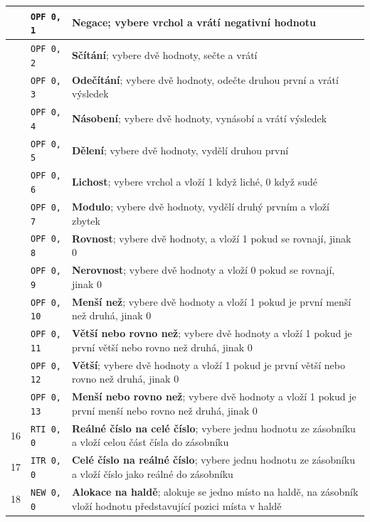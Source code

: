 \documentclass[
12pt,
a4paper,
pdftex,
czech,
titlepage
]{report}
\begin{document}
\begin{longtable}{|c|l|p{10cm}|}
\rule{0pt}{3ex} & \texttt{OPF 0, 1} & \textbf{Negace}; vybere vrchol a vrátí negativní hodnotu \\ \hline
\rule{0pt}{3ex} & \texttt{OPF 0, 2} & \textbf{Sčítání}; vybere dvě hodnoty, sečte a vrátí \\ \hline
\rule{0pt}{3ex} & \texttt{OPF 0, 3} & \textbf{Odečítání}; vybere dvě hodnoty, odečte druhou první a vrátí výsledek \\ \hline
\rule{0pt}{3ex} & \texttt{OPF 0, 4} & \textbf{Násobení}; vybere dvě hodnoty, vynásobí a vrátí výsledek \\ \hline
\rule{0pt}{3ex} & \texttt{OPF 0, 5} & \textbf{Dělení}; vybere dvě hodnoty, vydělí druhou první \\ \hline
\rule{0pt}{3ex} & \texttt{OPF 0, 6} & \textbf{Lichost}; vybere vrchol a vloží 1 když liché, 0 když sudé \\ \hline
\rule{0pt}{3ex} & \texttt{OPF 0, 7} & \textbf{Modulo}; vybere dvě hodnoty, vydělí druhý prvním a vloží zbytek \\ \hline
\rule{0pt}{3ex} & \texttt{OPF 0, 8} & \textbf{Rovnost}; vybere dvě hodnoty, a vloží 1 pokud se rovnají, jinak 0 \\ \hline
\rule{0pt}{3ex} & \texttt{OPF 0, 9} & \textbf{Nerovnost}; vybere dvě hodnoty a vloží 0 pokud se rovnají, jinak 0 \\ \hline
\rule{0pt}{3ex} & \texttt{OPF 0, 10} & \textbf{Menší než}; vybere dvě hodnoty a vloží 1 pokud je první menší než druhá, jinak 0 \\ \hline
\rule{0pt}{3ex} & \texttt{OPF 0, 11} & \textbf{Větší nebo rovno než}; vybere dvě hodnoty a vloží 1 pokud je první větší nebo rovno než druhá, jinak 0 \\ \hline
\rule{0pt}{3ex} & \texttt{OPF 0, 12} & \textbf{Větší}; vybere dvě hodnoty a vloží 1 pokud je první větší nebo rovno než druhá, jinak 0 \\ \hline
\rule{0pt}{3ex} & \texttt{OPF 0, 13} & \textbf{Menší nebo rovno než}; vybere dvě hodnoty a vloží 1 pokud je první menší nebo rovno než druhá, jinak 0 \\ \hline
\rule{0pt}{3ex} 16 & \texttt{RTI 0, 0} & \textbf{Reálné číslo na celé číslo}; vybere jednu hodnotu ze zásobníku a vloží celou část čísla do zásobníku \\ \hline
\rule{0pt}{3ex} 17 & \texttt{ITR 0, 0} & \textbf{Celé číslo na reálné číslo}; vybere jednu hodnotu ze zásobníku a vloží číslo jako reálné do zásobníku \\ \hline
\rule{0pt}{3ex} 18 & \texttt{NEW 0, 0} &  \textbf{Alokace na haldě}; alokuje se jedno místo na haldě, na zásobník vloží hodnotu představující pozici místa v haldě \\ \hline

\end{longtable}
\end{document}
